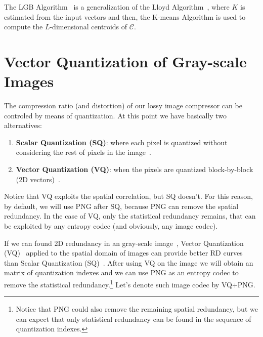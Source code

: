 The LGB Algorithm~\cite{linde1980algorithm} is a generalization of the
Lloyd Algorithm~\cite{lloyd1982least}, where $K$ is estimated
from the input vectors and then, the K-means Algorithm is used to
compute the $L$-dimensional centroids of $\mathcal{C}$.


\section{Vector Quantization of Gray-scale Images}


The compression ratio (and distortion) of our lossy image compressor
can be controled by means of quantization. At this point we have
basically two alternatives:
\begin{enumerate}
\item \textbf{Scalar Quantization (SQ)}: where each pixel is quantized
  without considering the rest of pixels in the
  image~\cite{vruiz__scalar_quantization}.
\item \textbf{Vector Quantization (VQ)}: when the pixels are quantized
  block-by-block (2D vectors)~\cite{vruiz__vector_quantization}.
\end{enumerate}
Notice that VQ exploits the spatial correlation, but SQ doesn't. For
this reason, by default, we will use PNG after SQ, because PNG can
remove the spatial redundancy. In the case of VQ, only the statistical
redundancy remains, that can be exploited by any entropy codec (and
obviously, any image codec).

If we can found 2D redundancy in an gray-scale
image~\cite{vruiz__image_IO}, Vector Quantization
(VQ)~\cite{vruiz__vector_quantization} applied to the spatial domain
of images can provide better RD curves than Scalar Quantization
(SQ)~\cite{vruiz__scalar_quantization}. After using VQ on the image we
will obtain an matrix of quantization indexes and we can use PNG as an
entropy codec to remove the statistical redundancy.\footnote{Notice
that PNG could also remove the remaining spatial redundancy, but we
can expect that only statistical redundancy can be found in the
sequence of quantization indexes.} Let's denote such image codec by
VQ+PNG.



